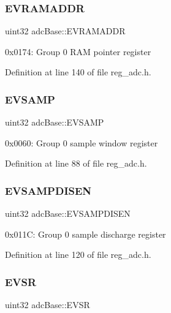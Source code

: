 \subsubsection{\texorpdfstring{E\+V\+R\+A\+M\+A\+D\+DR}{EVRAMADDR}}
{\footnotesize\ttfamily uint32 adc\+Base\+::\+E\+V\+R\+A\+M\+A\+D\+DR}

0x0174\+: Group 0 R\+AM pointer register 

Definition at line 140 of file reg\+\_\+adc.\+h.

\mbox{\label{structadcBase_aff7aa7e845213967950de59bffd71898}} 
\subsubsection{\texorpdfstring{E\+V\+S\+A\+MP}{EVSAMP}}
{\footnotesize\ttfamily uint32 adc\+Base\+::\+E\+V\+S\+A\+MP}

0x0060\+: Group 0 sample window register 

Definition at line 88 of file reg\+\_\+adc.\+h.

\mbox{\label{structadcBase_a284d867af22a82914329b74c4a69454a}} 
\subsubsection{\texorpdfstring{E\+V\+S\+A\+M\+P\+D\+I\+S\+EN}{EVSAMPDISEN}}
{\footnotesize\ttfamily uint32 adc\+Base\+::\+E\+V\+S\+A\+M\+P\+D\+I\+S\+EN}

0x011C\+: Group 0 sample discharge register 

Definition at line 120 of file reg\+\_\+adc.\+h.

\mbox{\label{structadcBase_a0d81378c97b884564a6ff45783bc2238}} 
\subsubsection{\texorpdfstring{E\+V\+SR}{EVSR}}
{\footnotesize\ttfamily uint32 adc\+Base\+::\+E\+V\+SR}

